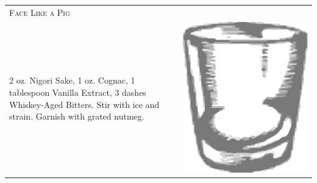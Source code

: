 \documentclass{article}
\begin{document}
\begin{tabular}{p{2in} p{0.5in}}
\multicolumn{2}{p{3in}}{\centering\Huge\textsc{Face Like a Pig}} \\ 
  \vspace{-0.1in}2 oz. Nigori Sake, 1 oz. Cognac, 1 tablespoon Vanilla Extract, 3 dashes Whiskey-Aged Bitters. Stir with ice and strain. Garnish with grated nutmeg. &
  \vspace{-0.1in} \includegraphics{rocks_glass.png}
\end{tabular}
\end{document}
